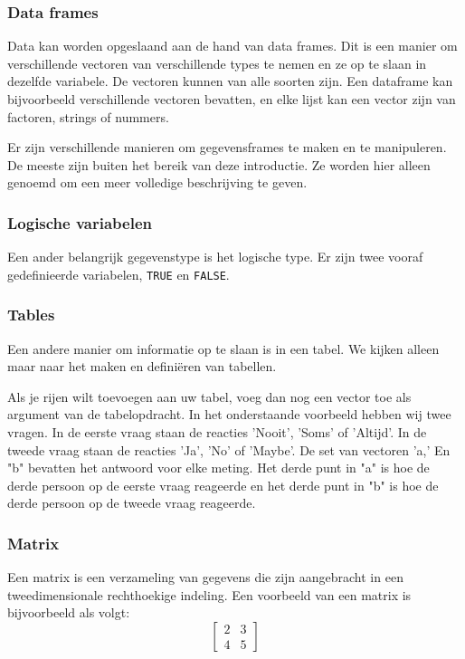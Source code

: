\subsubsection{Data frames}
Data kan worden opgeslaand aan de hand van data frames. Dit is een manier om verschillende vectoren van verschillende types te nemen en ze op te slaan in dezelfde variabele. De vectoren kunnen van alle soorten zijn. Een dataframe kan bijvoorbeeld verschillende vectoren bevatten, en elke lijst kan een vector zijn van factoren, strings of nummers.

Er zijn verschillende manieren om gegevensframes te maken en te manipuleren. De meeste zijn buiten het bereik van deze introductie. Ze worden hier alleen genoemd om een meer volledige beschrijving te geven. 



\subsubsection{Logische variabelen}
Een ander belangrijk gegevenstype is het logische type. Er zijn twee vooraf gedefinieerde variabelen, \texttt{TRUE} en \texttt{FALSE}.

\subsubsection{Tables}
Een andere  manier om informatie op te slaan is in een tabel.  We kijken alleen maar naar het maken en defini\"eren van tabellen. 


Als je rijen wilt toevoegen aan uw tabel, voeg dan nog een vector toe als argument van de tabelopdracht. In het onderstaande voorbeeld hebben wij twee vragen. In de eerste vraag staan de reacties  'Nooit', 'Soms' of 'Altijd'. In de tweede vraag staan de reacties 'Ja', 'No' of 'Maybe'. De set van vectoren 'a,' En "b" bevatten het antwoord voor elke meting. Het derde punt in "a" is hoe de derde persoon op de eerste vraag reageerde en het derde punt in "b" is hoe de derde persoon op de tweede vraag reageerde.



\subsubsection{Matrix}
Een matrix is een verzameling van gegevens die zijn aangebracht in een tweedimensionale rechthoekige indeling. Een voorbeeld van een matrix is bijvoorbeeld als volgt:
\[
\begin{bmatrix}
	2 & 3 \\ 
	4 & 5  
\end{bmatrix}
\]

